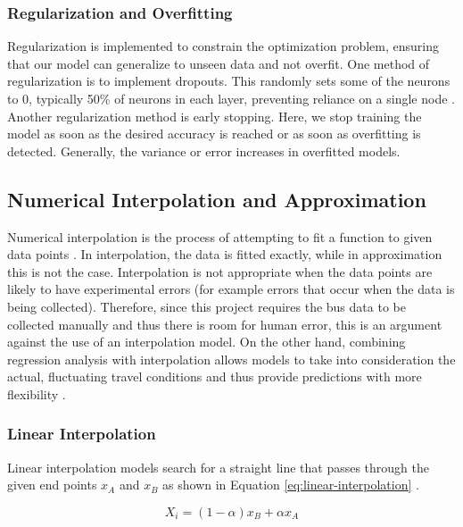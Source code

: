 \subsubsection{Regularization and Overfitting}

Regularization is implemented to constrain the optimization problem, ensuring that our model can generalize to unseen data and not overfit. One method of regularization is to implement dropouts. This randomly sets some of the neurons to 0, typically 50\% of neurons in each layer, preventing reliance on a single node \cite{methods-for-ds-slides}. Another regularization method is early stopping. Here, we stop training the model as soon as the desired accuracy is reached or as soon as overfitting is detected. Generally, the variance or error increases in overfitted models. 

\subsection{Numerical Interpolation and Approximation}

Numerical interpolation is the process of attempting to fit a function to given data points \cite{intro-to-numerical-analysis-atkinson}. In interpolation, the data is fitted exactly, while in approximation this is not the case. Interpolation is not appropriate when the data points are likely to have experimental errors (for example errors that occur when the data is being collected). Therefore, since this project requires the bus data to be collected manually and thus there is room for human error, this is an argument against the use of an interpolation model. On the other hand, combining regression analysis with interpolation allows models to take into consideration the actual, fluctuating travel conditions and thus provide predictions with more flexibility \cite{aviation-regression-interpolation}.

\subsubsection{Linear Interpolation}

Linear interpolation models search for a straight line that passes through the given end points $x_A$ and $x_B$ as shown in Equation \ref{eq:linear-interpolation} \cite{interpolation-in-time-series}.

\begin{equation}
    \label{eq:linear-interpolation}
    X_i = (1-\alpha)x_B + \alpha x_A
\end{equation}

